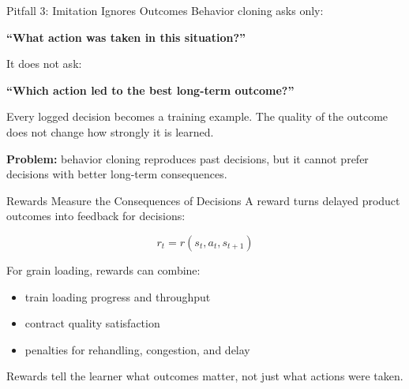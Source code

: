 \begin{frame}{Pitfall 3: Imitation Ignores Outcomes}
  Behavior cloning asks only:

  \vspace{0.12cm}
  \centering
  \textbf{``What action was taken in this situation?''}

  \vspace{0.28cm}
  \raggedright
  It does not ask:

  \vspace{0.12cm}
  \centering
  \textbf{``Which action led to the best long-term outcome?''}

  \vspace{0.28cm}
  \raggedright
  Every logged decision becomes a training example.
  The quality of the outcome does not change how strongly it is learned.

  \vspace{0.14cm}
  \textbf{Problem:} behavior cloning reproduces past decisions, but it cannot prefer decisions with better long-term consequences.
\end{frame}

\begin{frame}{Rewards Measure the Consequences of Decisions}
  A reward turns delayed product outcomes into feedback for decisions:

  \[
    r_t = r(s_t,a_t,s_{t+1})
  \]

  \vspace{0.25cm}
  For grain loading, rewards can combine:
  \begin{itemize}
    \item train loading progress and throughput
    \item contract quality satisfaction
    \item penalties for rehandling, congestion, and delay
  \end{itemize}

  \vspace{0.2cm}
  Rewards tell the learner what outcomes matter, not just what actions were taken.
\end{frame}

